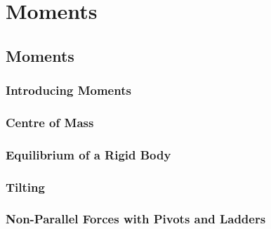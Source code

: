 \documentclass[../maths.tex]{subfiles}
\begin{document}
\chapter{Moments}
\section{Moments}
\subsection*{Introducing Moments}
\subsection*{Centre of Mass}
\subsection*{Equilibrium of a Rigid Body}
\subsection*{Tilting}
\subsection*{Non-Parallel Forces with Pivots and Ladders}
\end{document}
